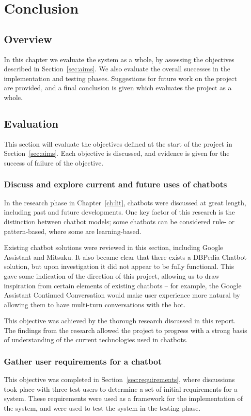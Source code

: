 \chapter{Conclusion}
\label{ch:conclusion}
\section{Overview}
In this chapter we evaluate the system as a whole, by assessing the objectives described in Section~\ref{sec:aims}. We also evaluate the overall successes in the implementation and testing phases. Suggestions for future work on the project are provided, and a final conclusion is given which evaluates the project as a whole.
\section{Evaluation}
This section will evaluate the objectives defined at the start of the project in Section~\ref{sec:aims}. Each objective is discussed, and evidence is given for the success of failure of the objective. 

\subsection{Discuss and explore current and future uses of chatbots}
In the research phase in Chapter~\ref{ch:lit}, chatbots were discussed at great length, including past and future developments. One key factor of this research is the distinction between chatbot models; some chatbots can be considered rule- or pattern-based, where some are learning-based.

Existing chatbot solutions were reviewed in this section, including Google Assistant and Mitsuku. It also became clear that there exists a DBPedia Chatbot solution, but upon investigation it did not appear to be fully functional. This gave some indication of the direction of this project, allowing us to draw inspiration from certain elements of existing chatbots -- for example, the Google Assistant Continued Conversation \cite{googleassistant} would make user experience more natural by allowing them to have multi-turn conversations with the bot.

This objective was achieved by the thorough research discussed in this report. The findings from the research allowed the project to progress with a strong basis of understanding of the current technologies used in chatbots.

\subsection{Gather user requirements for a chatbot}
This objective was completed in Section~\ref{sec:requirements}, where discussions took place with three test users to determine a set of initial requirements for a system. These requirements were used as a framework for the implementation of the system, and were used to test the system in the testing phase.

